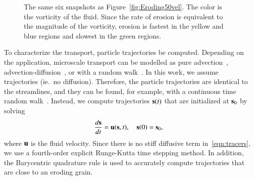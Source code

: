 \documentclass[preprint,10pt]{elsarticle}
\begin{document}
\begin{figure}[H]
\begin{center}
\caption{\label{fig:Eroding50vort} The same six snapshots as
Figure~\ref{fig:Eroding50vel}.  The color is the vorticity of the fluid.
Since the rate of erosion is equivalent to the magnitude of the
vorticity, erosion is fastest in the yellow and blue regions and slowest
in the green regions.}
\end{center}
\end{figure}

To characterize the transport, particle trajectories  be
computed. Depending on the application, microscale transport can be
modelled as pure advection~\cite{dea-qua-bir-jua2018,
leb-ded-dav-bou2007, cve-che-wen1996, puy-gou-den2019},
advection-diffusion~\cite{cus-hu-den1995, dag1987, den-ica-hid2018}, or
with a random walk~\cite{saf1959, bij-blu2006, ber-sch-sil2000}.  In
this work, we assume trajectories  (ie.~no diffusion). Therefore, the particle trajectories are
identical to the streamlines, and they can be found, for example, with a
continuous time random walk~\cite{mon-wei1965, den-cor-sch-ber2004,
leb-den-car2008, ber-cor-den-sch2006}.  
Instead,  we compute
trajectories $\ss(t)$ that are initialized at $\ss_0$ by solving
\begin{align}
  \frac{d\ss}{dt} = \uu(\ss,t), \quad \ss(0) = \ss_0,
  \label{eqn:tracers}
\end{align}
where $\uu$ is the fluid velocity.  Since there is no stiff diffusive
term in~\eqref{eqn:tracers}, we use a fourth-order explicit Runge-Kutta
time stepping method.  In addition, the Barycentric quadrature rule is
used to accurately compute trajectories that are close to an eroding
grain.
\end{document}
